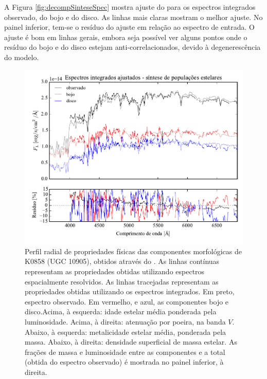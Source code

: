 A Figura \ref{fig:decompSinteseSpec} mostra ajuste do \starlight para os
espectros integrados observado, do bojo e do disco. As linhas mais claras
mostram o melhor ajuste. No painel inferior, tem-se o resíduo do ajuste em
relação ao espectro de entrada. O ajuste é bom em linhas gerais, embora seja
possível ver alguns pontos onde o resíduo do bojo e do disco estejam
anti-correlacionados, devido à degenerescência do modelo.


\begin{figure}
	\includegraphics[page=16]{figuras/sample006a_synthesis}
	\caption[Propriedades físicas das componentes morfológicas de K0858 (UGC 10905)]
	{Perfil radial de propriedades físicas das componentes morfológicas de
	K0858 (UGC 10905), obtidos através do \starlight. As linhas contínuas
	representam as propriedades obtidas utilizando espectros espacialmente
	resolvidos. As linhas tracejadas representam as propriedades obtidas utilizando
	os espectros integrados. Em preto, espectro observado. Em vermelho, e azul, as
	componentes bojo e disco.Acima, à esquerda: idade estelar média ponderada pela
	luminosidade. Acima, à direita: atenuação por poeira, na banda $V$. Abaixo, à
	esquerda: metalicidade estelar média, ponderada pela massa. Abaixo, à direita:
	densidade superficial de massa estelar. As frações de massa e luminosidade
	entre as componentes e a total (obtida do espectro observado) é mostrada no
	painel inferior, à direita.}
	\label{fig:decompSinteseRadprof}
\end{figure}

